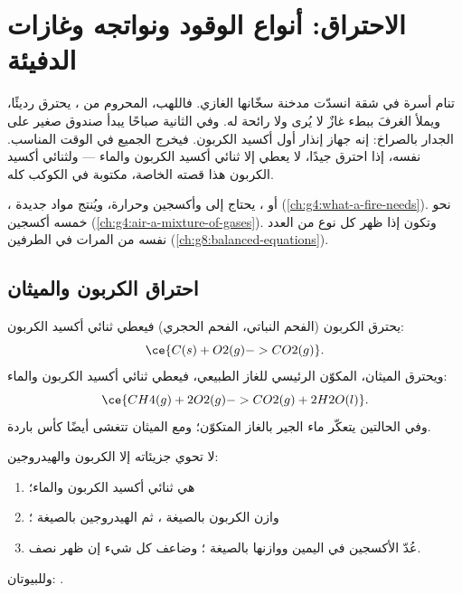 \chapter{الاحتراق: أنواع الوقود ونواتجه وغازات الدفيئة}\label{ch:g8:combustion-and-fuels}

تنام أسرة في شقة انسدّت مدخنة سخّانها الغازي. فاللهب، المحروم من ،
يحترق  رديئًا، ويملأ الغرفَ ببطء غازٌ لا يُرى ولا رائحة له. وفي
الثانية صباحًا يبدأ صندوق صغير على الجدار بالصراخ: إنه جهاز إنذار أول أكسيد
الكربون. فيخرج الجميع في الوقت المناسب.  نفسه، إذا احترق جيدًا، لا
يعطي إلا ثنائي أكسيد الكربون والماء --- ولثنائي أكسيد الكربون هذا قصته
الخاصة، مكتوبة في  الكوكب كله.

\begin{recall}
، أو ، يحتاج إلى  وأكسجين وحرارة، ويُنتج مواد جديدة
(\cref{ch:g4:what-a-fire-needs}).  نحو خمسه أكسجين
(\cref{ch:g4:air-a-mixture-of-gases}). وتكون  إذا ظهر كل نوع
من  العدد نفسه من المرات في الطرفين
(\cref{ch:g8:balanced-equations}).
\end{recall}

\section{احتراق الكربون والميثان}

\begin{example}[احتراقان]\label{ex:g8:combustion-and-fuels:two}
يحترق الكربون (الفحم النباتي، الفحم الحجري) فيعطي ثنائي أكسيد الكربون:
\[
  \ce{C(s) + O2(g) -> CO2(g)}.
\]
ويحترق الميثان، المكوّن الرئيسي للغاز الطبيعي، فيعطي ثنائي أكسيد الكربون
والماء:
\[
  \ce{CH4(g) + 2O2(g) -> CO2(g) + 2H2O(l)}.
\]
وفي الحالتين يتعكّر ماء الجير بالغاز المتكوّن؛ ومع الميثان تتغشى أيضًا كأس
باردة.
\end{example}

\begin{method}\label{met:g8:combustion-and-fuels:write}
 لا تحوي جزيئاته إلا الكربون والهيدروجين:
\begin{enumerate}
  \item {} هي ثنائي أكسيد الكربون والماء؛
  \item وازن الكربون بالصيغة ، ثم الهيدروجين بالصيغة ؛
  \item عُدّ  الأكسجين في اليمين ووازنها بالصيغة
        ؛ وضاعف كل شيء إن ظهر نصف.
\end{enumerate}
وللبيوتان: .
\end{method}

